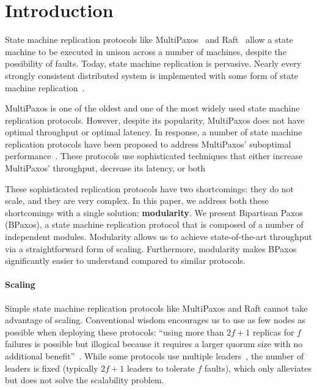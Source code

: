 \section{Introduction}
State machine replication protocols like MultiPaxos~\cite{lamport1998part,
lamport2001paxos} and Raft~\cite{ongaro2014search} allow a state machine to be
executed in unison across a number of machines, despite the possibility of
faults. Today, state machine replication is pervasive. Nearly every strongly
consistent distributed system is implemented with some form of state machine
replication~\cite{corbett2013spanner, thomson2012calvin, burrows2006chubby,
baker2011megastore, cockroach2019website, cosmos2019website, tidb2019website,
yugabyte2019website}.

MultiPaxos is one of the oldest and one of the most widely used state machine
replication protocols. However, despite its popularity, MultiPaxos does not have
optimal throughput or optimal latency. In response, a number of state machine
replication protocols have been proposed to address MultiPaxos' suboptimal
performance~\cite{%
  arun2017speeding,
  biely2012s,
  howard2016flexible,
  lamport2005generalized,
  lamport2006fast,
  li2016just,
  mao2008mencius,
  moraru2013there,
  nawab2018dpaxos,
  park2019exploiting,
  ports2015designing
}.
These protocols use sophisticated techniques that either increase MultiPaxos'
throughput, decrease its latency, or both

These sophisticated replication protocols have two shortcomings: they do not
scale, and they are very complex. In this paper, we address both these
shortcomings with a single solution: \textbf{modularity}. We present Bipartisan
Paxos (BPaxos), a state machine replication protocol that is composed of a
number of independent modules. Modularity allows us to achieve state-of-the-art
throughput via a straightforward form of scaling. Furthermore, modularity makes
BPaxos significantly easier to understand compared to similar protocols.

\paragraph{Scaling}
Simple state machine replication protocols like MultiPaxos and Raft cannot take
advantage of scaling. Conventional wisdom encourages us to use as few nodes as
possible when deploying these protocols: ``using more than $2f+1$ replicas for
$f$ failures is possible but illogical because it requires a larger quorum size
with no additional benefit''~\cite{zhang2018building}. While some protocols use
multiple leaders~\cite{mao2008mencius, moraru2013there, arun2017speeding}, the
number of leaders is fixed (typically $2f+1$ leaders to tolerate $f$ faults),
which only alleviates but does not solve the scalability problem.
%

